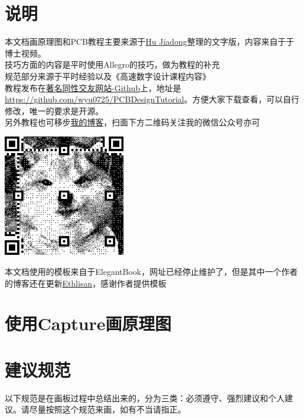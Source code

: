 \documentclass[color=green,mathpazo,titlestyle=hang,11pt]{elegantbook}
\author{Wang Yu}
\begin{document}
\maketitle
\tableofcontents
\mainmatter
\chapter*{说明}
本文档画原理图和PCB教程主要来源于\href{mailto:hdjemail@mail.ustc.edu.cn}{Hu Jiadong}整理的文字版，内容来自于于博士视频。\\
技巧方面的内容是平时使用Allegro的技巧，做为教程的补充\\
规范部分来源于平时经验以及《高速数字设计课程内容》\\
教程发布在\href{https://zh.wikipedia.org/wiki/Wikipedia:%E5%9D%8F%E7%AC%91%E8%AF%9D%E5%92%8C%E5%88%A0%E9%99%A4%E7%9A%84%E8%83%A1%E8%AF%9D/GitHub}{著名同性交友网站-Github}上，地址是\href{https://github.com/wyu0725/PCBDesignTutorial}{https://github.com/wyu0725/PCBDesignTutorial}。方便大家下载查看，可以自行修改，唯一的要求是开源。\\
另外教程也可移步\href{https://wyu0725.github.io}{我的博客}，扫面下方二维码关注我的微信公众号亦可\\
\begin{center}
\includegraphics[width=0.4\textwidth]{figures/MyQRCode.png}\\
\end{center}
本文档使用的模板来自于ElegantBook，网址已经停止维护了，但是其中一个作者的博客还在更新\href{http://ddswhu.com/}{Ethlisan}，感谢作者提供模板

\chapter{使用Capture画原理图}
\chapter{建议规范}
以下规范是在画板过程中总结出来的，分为三类：必须遵守、强烈建议和个人建议。请尽量按照这个规范来画，如有不当请指正。
\end{document}
